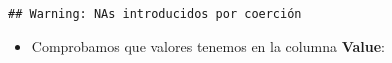 \documentclass[]{article}
\newenvironment{Shaded}{\begin{snugshade}}{\end{snugshade}}
\newcommand{\DataTypeTok}[1]{\textcolor[rgb]{0.13,0.29,0.53}{#1}}
\newcommand{\KeywordTok}[1]{\textcolor[rgb]{0.13,0.29,0.53}{\textbf{#1}}}
\newcommand{\NormalTok}[1]{#1}
\newcommand{\OperatorTok}[1]{\textcolor[rgb]{0.81,0.36,0.00}{\textbf{#1}}}
\newcommand{\StringTok}[1]{\textcolor[rgb]{0.31,0.60,0.02}{#1}}
\providecommand{\tightlist}{%
  \setlength{\itemsep}{0pt}\setlength{\parskip}{0pt}}
\begin{document}
\begin{verbatim}
## Warning: NAs introducidos por coerción
\end{verbatim}

\begin{itemize}
\tightlist
\item
  Comprobamos que valores tenemos en la columna \textbf{Value}:
\end{itemize}

\begin{Shaded}
\end{Shaded}
\end{document}
